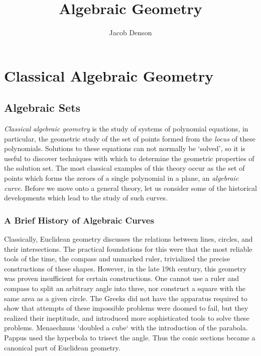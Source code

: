 

\title{Algebraic Geometry}
\author{Jacob Denson}



\maketitle
\tableofcontents
{}

\part{Classical Algebraic Geometry}

\chapter{Algebraic Sets}

\emph{Classical algebraic geometry} is the study of systems of polynomial equations, in particular, the geometric study of the set of points formed from the \emph{locus} of these polynomials. Solutions to these equations can not normally be `solved', so it is useful to discover techniques with which to determine the geometric properties of the solution set. The most classical examples of this theory occur as the set of points which forms the zeroes of a single polynomial in a plane, an \emph{algebraic curve}. Before we move onto a general theory, let us consider some of the historical developments which lead to the study of such curves.

\section{A Brief History of Algebraic Curves}

Classically, Euclidean geometry discusses the relations between lines, circles, and their intersections. The practical foundations for this were that the most reliable tools of the time, the compass and unmarked ruler, trivialized the precise constructions of these shapes. However, in the late 19th century, this geometry was proven insufficient for certain constructions. One cannot use a ruler and compass to split an arbitrary angle into three, nor construct a square with the same area as a given circle. The Greeks did not have the apparatus required to show that attempts of these impossible problems were doomed to fail, but they realized their ineptitude, and introduced more sophisticated tools to solve these problems. Menaechmus `doubled a cube` with the introduction of the parabola. Pappus used the hyperbola to trisect the angle. Thus the conic sections became a canonical part of Euclidean geometry.

